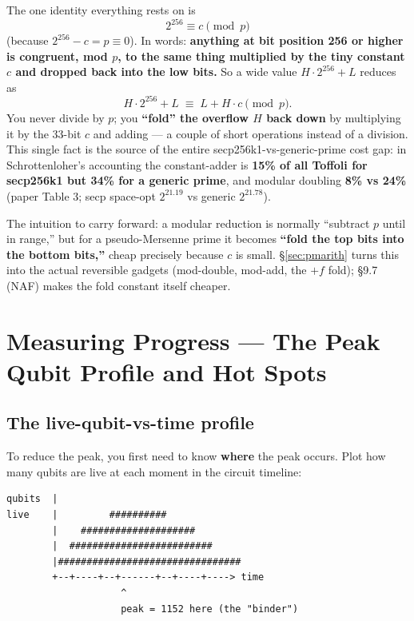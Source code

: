 \documentclass[11pt,a4paper]{article}
\begin{document}
The one identity everything rests on is
\[
  2^{256} \equiv c \pmod{p}
\]
(because $2^{256} - c = p \equiv 0$). In words: \textbf{anything at bit position 256 or higher is
congruent, mod $p$, to the same thing multiplied by the tiny constant $c$ and dropped back into the
low bits.} So a wide value $H\cdot 2^{256} + L$ reduces as
\[
  H\cdot 2^{256} + L \;\equiv\; L + H\cdot c \pmod{p}.
\]
You never divide by $p$; you \textbf{``fold'' the overflow $H$ back down} by multiplying it by the
33-bit $c$ and adding --- a couple of short operations instead of a division. This single fact is the
source of the entire secp256k1-vs-generic-prime cost gap: in Schrottenloher's accounting the
constant-adder is \textbf{15\% of all Toffoli for secp256k1 but 34\% for a generic prime}, and
modular doubling \textbf{8\% vs 24\%} (paper Table 3; secp space-opt $2^{21.19}$ vs generic
$2^{21.78}$).

The intuition to carry forward: a modular reduction is normally ``subtract $p$ until in range,'' but
for a pseudo-Mersenne prime it becomes \textbf{``fold the top bits into the bottom bits,''} cheap
precisely because $c$ is small. \S\ref{sec:pmarith} turns this into the actual reversible gadgets
(mod-double, mod-add, the $+f$ fold); \S9.7 (NAF) makes the fold constant itself cheaper.

\section{Measuring Progress --- The Peak Qubit Profile and Hot Spots}
\label{sec:measuring}

\subsection{The live-qubit-vs-time profile}

To reduce the peak, you first need to know \textbf{where} the peak occurs. Plot how many qubits
are live at each moment in the circuit timeline:

\begin{lstlisting}
qubits  |
live    |         ##########
        |    ####################
        |  #########################
        |################################
        +--+----+--+------+--+----+----> time
                    ^
                    peak = 1152 here (the "binder")
\end{lstlisting}
\end{document}
